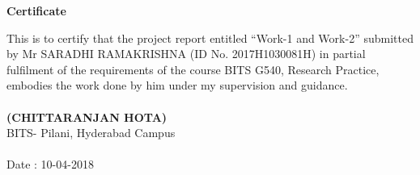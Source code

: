 \documentclass{report}
\begin{document}
\begin{center}
\textbf{\large{Certificate} } \\[20pt]


\end{center}

\begin{flushleft}
This is to certify that the project report entitled “Work-1 and Work-2” submitted by Mr SARADHI RAMAKRISHNA (ID No. 2017H1030081H) in partial
fulfilment of the requirements of the course BITS G540, Research Practice, embodies
the work done by him under my supervision and guidance.
\end{flushleft}

\paragraph{}
\paragraph{}
\paragraph{}
\paragraph{}
\begin{flushright}
\textbf{(CHITTARANJAN HOTA)} \\[5pt]
BITS- Pilani, Hyderabad Campus
\end{flushright}

\paragraph{}
\begin{flushleft}
Date : 10-04-2018
\end{flushleft}

\thispagestyle{empty}
\newpage







\thispagestyle{empty}
 
\tableofcontents
 
\listoffigures
 
\listoftables

\lstlistoflistings

\newpage
 
\end{document}
